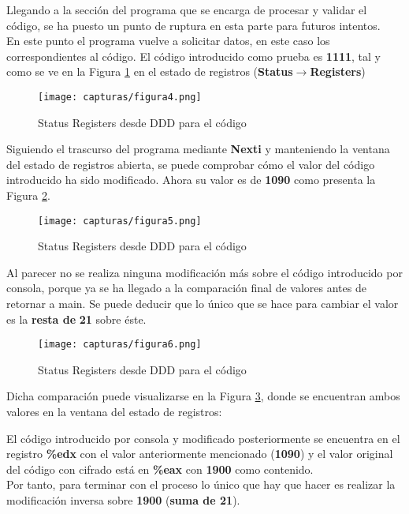 Llegando a la sección del programa que se encarga de procesar y validar el código, se ha puesto un punto de ruptura en esta parte para futuros intentos.\\

En este punto el programa vuelve a solicitar datos, en este caso los correspondientes al código. El código introducido como prueba es \textbf{1111}, tal y como se ve en la Figura \ref{fig:figura4} en el estado de registros (\textbf{Status}$ \rightarrow $\textbf{Registers})
\begin{figure}[H]
	\centering
	\texttt{[image: capturas/figura4.png]} 
	\caption{Status Registers desde DDD para el código} 
	\label{fig:figura4}
\end{figure}

Siguiendo el trascurso del programa mediante \textbf{Nexti} y manteniendo la ventana del estado de registros abierta, se puede comprobar cómo el valor del código introducido ha sido modificado. Ahora su valor es de \textbf{1090} como presenta la Figura \ref{fig:figura5}.

\begin{figure}[H]
	\centering
	\texttt{[image: capturas/figura5.png]} 
	\caption{Status Registers desde DDD para el código} 
	\label{fig:figura5}
\end{figure}

Al parecer no se realiza ninguna modificación más sobre el código introducido por consola, porque ya se ha llegado a la comparación final de valores antes de retornar a main. Se puede deducir que lo único que se hace para cambiar el valor es la \textbf{resta de} \textbf{21} sobre éste.

\begin{figure}[H]
	\centering
	\texttt{[image: capturas/figura6.png]} 
	\caption{Status Registers desde DDD para el código} 
	\label{fig:figura6}
\end{figure}

Dicha comparación puede visualizarse en la Figura \ref{fig:figura6}, donde se encuentran ambos valores en la ventana del estado de registros:

El código introducido por consola y modificado posteriormente se encuentra en el registro \textbf{\%edx} con el valor anteriormente mencionado (\textbf{1090}) y el valor original del código con cifrado está en \textbf{\%eax} con \textbf{1900} como contenido.\\

Por tanto, para terminar con el proceso lo único que hay que hacer es realizar la modificación inversa sobre \textbf{1900} (\textbf{suma de 21}).
\\

